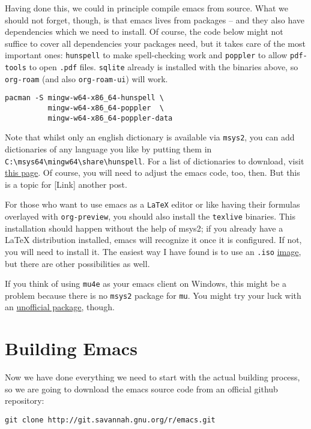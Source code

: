 \documentclass[a4paper, fontsize=11pt, headings=optiontohead, headsepline=true, twoside=false]{scrartcl}
\begin{document}
Having done this, we could in principle compile emacs from
source. What we should not forget, though, is that emacs lives from
packages -- and they also have dependencies which we need to
install. Of course, the code below might not suffice to cover
all dependencies your packages need, but it takes care of the most
important ones: \texttt{hunspell} to make spell-checking work and \texttt{poppler} to
allow \texttt{pdf-tools} to open \texttt{.pdf} files. \texttt{sqlite} already is installed with
the binaries above, so \texttt{org-roam} (and also \texttt{org-roam-ui}) will work.
\lstset{language=bash,label= ,caption= ,captionpos=b,numbers=none}
\begin{lstlisting}
pacman -S mingw-w64-x86_64-hunspell \
		  mingw-w64-x86_64-poppler  \
		  mingw-w64-x86_64-poppler-data
\end{lstlisting}
Note that whilst only an english dictionary is available via \texttt{msys2},
you can add dictionaries of any language you like by putting them
in \texttt{C:\textbackslash{}msys64\textbackslash{}mingw64\textbackslash{}share\textbackslash{}hunspell}. For a list of dictionaries to
download, visit \href{https://github.com/elastic/hunspell/tree/master/dicts}{this page}. Of course, you will need to adjust the
emacs code, too, then. But this is a topic for [Link] another post.

For those who want to use emacs as a \texttt{LaTeX} editor or like having their
formulas overlayed with \texttt{org-preview}, you should also install the \texttt{texlive}
binaries. This installation should happen without the help of msys2;
if you already have a \LaTeX{} distribution installed, emacs will
recognize it once it is configured. If not, you will need to install it. The
easiest way I have found is to use an \texttt{.iso} \href{https://www.tug.org/texlive/acquire-iso.html}{image}, but there are other
possibilities as well.

If you think of using \texttt{mu4e} as your emacs client on Windows, this might be a
problem because there is no \texttt{msys2} package for \texttt{mu}. You might try your
luck with an \href{https://github.com/msys2-unofficial/MSYS2-packages/tree/master/mu}{unofficial package}, though.
\section{Building Emacs}
\label{sec:org73feaf6}
Now we have done everything we need to start with the actual building
process, so we are going to download the emacs source code from an
official github repository:
\lstset{language=bash,label= ,caption= ,captionpos=b,numbers=none}
\begin{lstlisting}
git clone http://git.savannah.gnu.org/r/emacs.git
\end{lstlisting}
\end{document}
